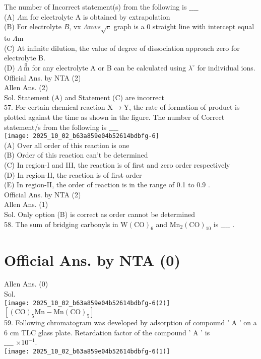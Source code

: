 \documentclass[10pt]{article}
\begin{document}
The number of Incorrect statement(s) from the following is \(\_\_\_\_\)\\
(A) \(\Lambda \mathrm{m}\) for electrolyte A is obtained by extrapolation\\
(B) For electrolyte \(B\), vx \(\Lambda \mathrm{m} v s \sqrt{\mathrm{c}}\) graph is a 0 straight line with intercept equal to \(\Lambda \mathrm{m}\)\\
(C) At infinite dilution, the value of degree of dissociation approach zero for electrolyte B.\\
(D) \(\Lambda \stackrel{0}{\mathrm{~m}}\) for any electrolyte A or B can be calculated using \(\lambda^{\circ}\) for individual ions.\\
Official Ans. by NTA (2)\\
Allen Ans. (2)\\
Sol. Statement (A) and Statement (C) are incorrect\\
57. For certain chemical reaction \(\mathrm{X} \rightarrow \mathrm{Y}\), the rate of formation of product is plotted against the time as shown in the figure. The number of Correct statement/s from the following is \(\_\_\_\_\)\\
\texttt{[image: 2025\_10\_02\_b63a859e04b52614bdbfg-6]}\\
(A) Over all order of this reaction is one\\
(B) Order of this reaction can't be determined\\
(C) In region-I and III, the reaction is of first and zero order respectively\\
(D) In region-II, the reaction is of first order\\
(E) In region-II, the order of reaction is in the range of 0.1 to 0.9 .\\
Official Ans. by NTA (2)\\
Allen Ans. (1)\\
Sol. Only option (B) is correct as order cannot be determined\\
58. The sum of bridging carbonyls in \(\mathrm{W}(\mathrm{CO})_{6}\) and \(\mathrm{Mn}_{2} (\mathrm{CO})_{10}\) is \(\_\_\_\_\) .

\section*{Official Ans. by NTA (0)}
Allen Ans. (0)\\
Sol.\\
\texttt{[image: 2025\_10\_02\_b63a859e04b52614bdbfg-6(2)]}\\
\(\left[(\mathrm{CO})_{5} \mathrm{Mn}-\mathrm{Mn}(\mathrm{CO})_{5}\right]\)\\
59. Following chromatogram was developed by adsorption of compound ' A ' on a 6 cm TLC glass plate. Retardation factor of the compound ' A ' is\\
\(\_\_\_\_\) \(\times 10^{-1}\).\\
\texttt{[image: 2025\_10\_02\_b63a859e04b52614bdbfg-6(1)]}
\end{document}
